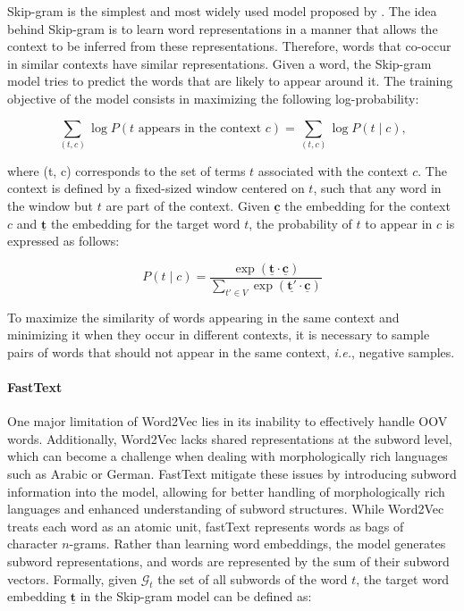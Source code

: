 Skip-gram is the simplest and most widely used model proposed by \citet{mikolov2013efficient}. The idea behind Skip-gram is to learn word representations in a manner that allows the context to be inferred from these representations. Therefore, words that co-occur in similar contexts have similar representations. Given a word, the Skip-gram model tries to predict the words that are likely to appear around it. The training objective of the model consists in maximizing the following log-probability:

\begin{equation}
    \sum_{(t, c)} \log P(t \text{ appears in the context } c) = \sum_{(t, c)} \log P(t \mid c),
\end{equation}

\noindent where (t, c) corresponds to the set of terms $t$ associated with the context $c$. The context is defined by a fixed-sized window centered on $t$, such that any word in the window but $t$ are part of the context. Given $\bm{\underline{c}}$ the embedding for the context $c$ and $\bm{\underline{t}}$ the embedding for the target word $t$, the probability of $t$ to appear in $c$ is expressed as follows:

\begin{equation}
    P(t \mid c) = \frac{\exp (\bm{\underline{t}} \cdot \bm{\underline{c}})}{\sum_{t' \in V} \exp (\bm{\underline{t'}} \cdot \bm{\underline{c}})}
\end{equation}

To maximize the similarity of words appearing in the same context and minimizing it when they occur in different contexts, it is necessary to sample pairs of words that should not appear in the same context, \textit{i.e.}, negative samples. 


\paragraph{FastText} One major limitation of Word2Vec lies in its inability to effectively handle \ac{OOV} words. Additionally, Word2Vec lacks shared representations at the subword level, which can become a challenge when dealing with morphologically rich languages such as Arabic or German. FastText \citet{bojanowski2017enriching} mitigate these issues by introducing subword information into the model, allowing for better handling of morphologically rich languages and enhanced understanding of subword structures. While Word2Vec treats each word as an atomic unit, fastText represents words as bags of character $n$-grams. Rather than learning word embeddings, the model generates subword representations, and words are represented by the sum of their subword vectors. Formally, given $\mathcal{G}_t$ the set of all subwords of the word $t$, the target word embedding $\bm{\underline{t}}$ in the Skip-gram model can be defined as:

